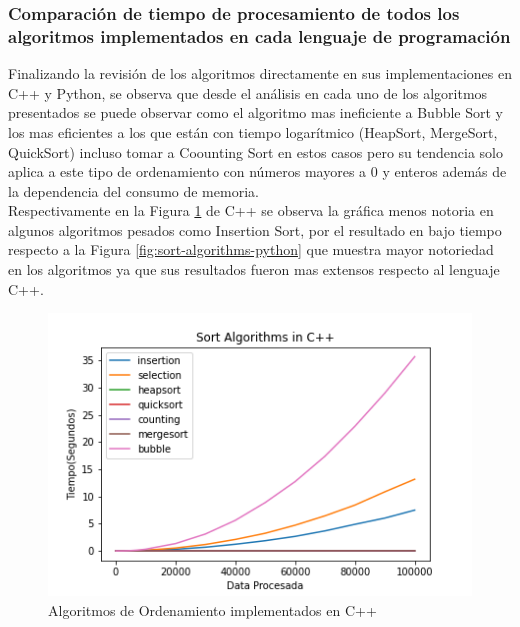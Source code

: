 \documentclass{article}
\begin{document}
		        \subsubsection{Comparación de tiempo de procesamiento de todos los algoritmos implementados en cada lenguaje de programación}
		            Finalizando la revisión de los algoritmos directamente en sus implementaciones en C++ y Python, se observa que desde el análisis en cada uno de los algoritmos presentados se puede observar como el algoritmo mas ineficiente a Bubble Sort y los mas eficientes a los que están con tiempo logarítmico (HeapSort, MergeSort, QuickSort) incluso tomar a Coounting Sort en estos casos pero su tendencia solo aplica a este tipo de ordenamiento con números mayores a 0 y enteros además de la dependencia del consumo de memoria.
		            \\
		            
		            Respectivamente en la Figura \ref{fig:sort-algorithms-cpp} de C++ se observa la gráfica menos notoria en algunos algoritmos pesados como Insertion Sort, por el resultado en bajo tiempo respecto a la Figura \ref{fig:sort-algorithms-python} que muestra mayor notoriedad en los algoritmos ya que sus resultados fueron mas extensos respecto al lenguaje C++.  
		        
		            \begin{figure}[H]
        				\centering
        				\includegraphics[scale=0.60]{img/sort-algorithms-cpp.png}
        				\caption{Algoritmos de Ordenamiento implementados en C++}
        				\label{fig:sort-algorithms-cpp}
                	\end{figure}
                			
\end{document}
